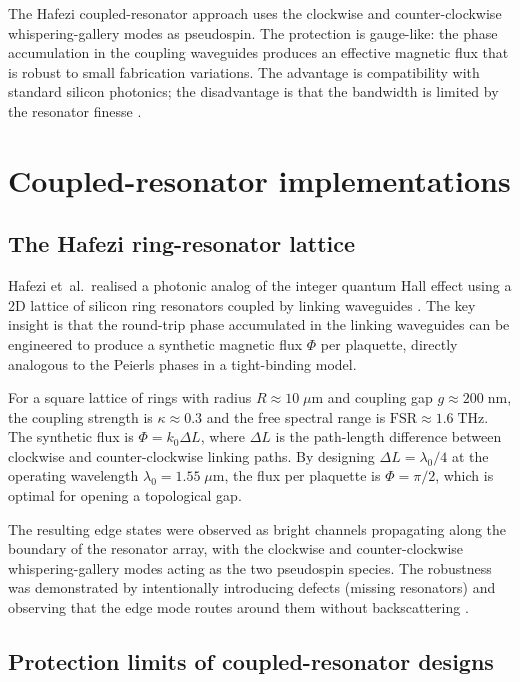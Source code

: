 The Hafezi coupled-resonator approach uses the clockwise and
counter-clockwise whispering-gallery modes as pseudospin.  The
protection is gauge-like: the phase accumulation in the coupling
waveguides produces an effective magnetic flux that is robust to
small fabrication variations.  The advantage is compatibility with
standard silicon photonics; the disadvantage is that the bandwidth
is limited by the resonator finesse
\cite{hafezi2013imaging,ozawa2018topological}.

\section{Coupled-resonator implementations}
\label{sec:ch11-coupled-resonator}

\subsection{The Hafezi ring-resonator lattice}
\label{sec:ch11-hafezi}

Hafezi et~al.\ realised a photonic analog of the integer quantum Hall
effect using a 2D lattice of silicon ring resonators coupled by
linking waveguides \cite{hafezi2013imaging,ozawa2018topological}.
The key insight is that the round-trip phase accumulated in the
linking waveguides can be engineered to produce a synthetic magnetic
flux $\Phi$ per plaquette, directly analogous to the Peierls phases
in a tight-binding model.

For a square lattice of rings with radius $R\approx 10\;\mu\mathrm{m}$
and coupling gap $g\approx 200\;\mathrm{nm}$, the coupling strength
is $\kappa\approx 0.3$ and the free spectral range is
$\mathrm{FSR}\approx 1.6\;\mathrm{THz}$.  The synthetic flux is
$\Phi=k_0\Delta L$, where $\Delta L$ is the path-length difference
between clockwise and counter-clockwise linking paths.  By designing
$\Delta L=\lambda_0/4$ at the operating wavelength
$\lambda_0=1.55\;\mu\mathrm{m}$, the flux per plaquette is
$\Phi=\pi/2$, which is optimal for opening a topological gap.

The resulting edge states were observed as bright channels propagating
along the boundary of the resonator array, with the clockwise and
counter-clockwise whispering-gallery modes acting as the two
pseudospin species.  The robustness was demonstrated by intentionally
introducing defects (missing resonators) and observing that the edge
mode routes around them without backscattering
\cite{hafezi2013imaging}.

\subsection{Protection limits of coupled-resonator designs}
\label{sec:ch11-protection-limits}

